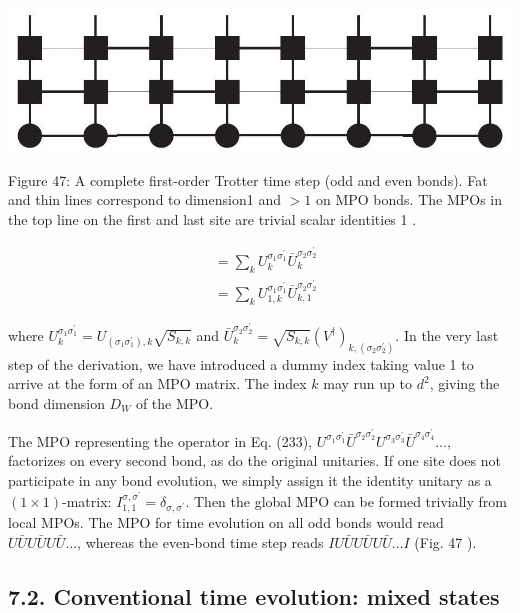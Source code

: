 \documentclass[12pt]{article}
\begin{document}
\begin{center}
\includegraphics[max width=\textwidth]{2024_05_04_afc4ad226da9ccfe0ac8g-078}
\end{center}

Figure 47: A complete first-order Trotter time step (odd and even bonds). Fat and thin lines correspond to dimension1 and $>1$ on MPO bonds. The MPOs in the top line on the first and last site are trivial scalar identities 1 .

$$
\begin{aligned}
& =\sum_{k} U_{k}^{\sigma_{1} \sigma_{1}^{\prime}} \bar{U}_{k}^{\sigma_{2} \sigma_{2}^{\prime}} \\
& =\sum_{k} U_{1, k}^{\sigma_{1} \sigma_{1}^{\prime}} \bar{U}_{k, 1}^{\sigma_{2} \sigma_{2}^{\prime}}
\end{aligned}
$$

where $U_{k}^{\sigma_{1} \sigma_{1}^{\prime}}=U_{\left(\sigma_{1} \sigma_{1}^{\prime}\right), k} \sqrt{S_{k, k}}$ and $\bar{U}_{k}^{\sigma_{2} \sigma_{2}^{\prime}}=\sqrt{S_{k, k}}\left(V^{\dagger}\right)_{k,\left(\sigma_{2} \sigma_{2}^{\prime}\right)}$. In the very last step of the derivation, we have introduced a dummy index taking value 1 to arrive at the form of an MPO matrix. The index $k$ may run up to $d^{2}$, giving the bond dimension $D_{W}$ of the MPO.

The MPO representing the operator in Eq. (233), $U^{\sigma_{1} \sigma_{1}^{\prime}} \bar{U}^{\sigma_{2} \sigma_{2}^{\prime}} U^{\sigma_{3} \sigma_{3}^{\prime}} \bar{U}^{\sigma_{4} \sigma_{4}^{\prime}} \ldots$, factorizes on every second bond, as do the original unitaries. If one site does not participate in any bond evolution, we simply assign it the identity unitary as a $(1 \times 1)$-matrix: $I_{1,1}^{\sigma, \sigma^{\prime}}=\delta_{\sigma, \sigma^{\prime}}$. Then the global MPO can be formed trivially from local MPOs. The MPO for time evolution on all odd bonds would read $U \bar{U} U \bar{U} U \bar{U} \ldots$, whereas the even-bond time step reads $I U \bar{U} U \bar{U} U \bar{U} \ldots I$ (Fig. 47 ).

\subsection*{7.2. Conventional time evolution: mixed states}
\end{document}
